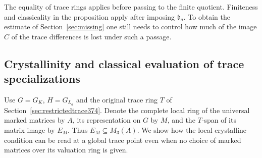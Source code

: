 \documentclass[a4paper,11pt]{article}
\theoremstyle{definition}
\theoremstyle{remark}
\numberwithin{equation}{section}
\begin{document}
The equality of trace rings applies before passing to the
finite quotient. Finiteness and classicality in the proposition
apply after imposing \(\mathfrak b_a\). To obtain the estimate
of Section~\ref{sec:missing} one still needs to control how
much of the image \(C\) of the trace differences is lost
under such a passage.


\subsection{Crystallinity and classical evaluation of trace specializations}
\label{sec:tracecrystal375}

Use \(G=G_K\), \(H=G_{L_a}\) and the original trace ring \(T\)
of Section~\ref{sec:restrictedtrace374}. Denote the complete
local ring of the universal marked matrices by \(A\), its
representation on \(G\) by \(M\), and the \(T\)-span of its
matrix image by \(E_M\).
Thus \(E_M\subseteq M_3(A)\). We show how the local crystalline
condition can be read at a global trace point even when no
choice of marked matrices over its valuation ring is given.
\end{document}
